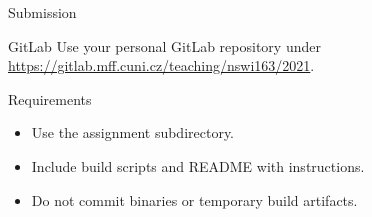 \begin{frame}{Submission}
    \begin{block}{GitLab}
        Use your personal GitLab repository under \\
        \url{https://gitlab.mff.cuni.cz/teaching/nswi163/2021}.
    \end{block}
    \begin{block}{Requirements}
        \begin{itemize}
            \item Use the assignment subdirectory.
            \item Include build scripts and README with instructions.
            \item Do not commit binaries or temporary build artifacts.
        \end{itemize}
    \end{block}
\end{frame}


